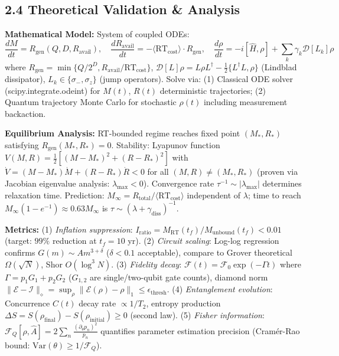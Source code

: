 \documentclass[a4paper,11pt,twoside]{article}
\begin{document}
\vspace{-4pt}
\subsection*{2.4 Theoretical Validation \& Analysis}
\vspace{-4pt}

\textbf{Mathematical Model:} System of coupled ODEs:
\vspace{-4pt}
\[
\frac{dM}{dt} = R_{\text{gen}}(Q, D, R_{\text{avail}}), \quad \frac{dR_{\text{avail}}}{dt} = -\langle\text{RT}_{\text{cost}}\rangle \cdot R_{\text{gen}}, \quad \frac{d\rho}{dt} = -i[\hat{H}, \rho] + \sum_k \gamma_k \mathcal{D}[L_k]\rho
\]
\vspace{-6pt}
where $R_{\text{gen}} = \min\{Q/2^D, R_{\text{avail}}/\text{RT}_{\text{cost}}\}$, $\mathcal{D}[L]\rho = L\rho L^\dagger - \frac{1}{2}\{L^\dagger L, \rho\}$ (Lindblad dissipator), $L_k \in \{\sigma_-, \sigma_z\}$ (jump operators). Solve via: (1) Classical ODE solver (scipy.integrate.odeint) for $M(t)$, $R(t)$ deterministic trajectories; (2) Quantum trajectory Monte Carlo for stochastic $\rho(t)$ including measurement backaction.

\textbf{Equilibrium Analysis:} RT-bounded regime reaches fixed point $(M_*, R_*)$ satisfying $R_{\text{gen}}(M_*, R_*) = 0$. Stability: Lyapunov function $V(M,R) = \frac{1}{2}[(M-M_*)^2 + (R-R_*)^2]$ with $\dot{V} = (M-M_*)\dot{M} + (R-R_*)\dot{R} < 0$ for all $(M,R) \neq (M_*,R_*)$ (proven via Jacobian eigenvalue analysis: $\lambda_{\text{max}} < 0$). Convergence rate $\tau^{-1} \sim |\lambda_{\text{max}}|$ determines relaxation time. Prediction: $M_{\infty} = R_{\text{total}}/\langle\text{RT}_{\text{cost}}\rangle$ independent of $\lambda$; time to reach $M_{\infty}(1-e^{-1}) \approx 0.63M_{\infty}$ is $\tau \sim (\lambda + \gamma_{\text{diss}})^{-1}$.

\textbf{Metrics:} (1) \textit{Inflation suppression}: $I_{\text{ratio}} = M_{\text{RT}}(t_f)/M_{\text{unbound}}(t_f) < 0.01$ (target: $99\%$ reduction at $t_f = 10$ yr). (2) \textit{Circuit scaling}: Log-log regression confirms $G(m) \sim Am^{3+\delta}$ ($\delta < 0.1$ acceptable), compare to Grover theoretical $\Omega(\sqrt{N})$, Shor $O(\log^3 N)$. (3) \textit{Fidelity decay}: $\mathcal{F}(t) = \mathcal{F}_0 \exp(-\Gamma t)$ where $\Gamma = p_1 G_1 + p_2 G_2$ ($G_{1,2}$ are single/two-qubit gate counts), diamond norm $\|\mathcal{E} - \mathcal{I}\|_\diamond = \sup_{\rho}\|\mathcal{E}(\rho) - \rho\|_1 \leq \epsilon_{\text{thresh}}$. (4) \textit{Entanglement evolution}: Concurrence $C(t)$ decay rate $\propto 1/T_2$, entropy production $\Delta S = S(\rho_{\text{final}}) - S(\rho_{\text{initial}}) \geq 0$ (second law). (5) \textit{Fisher information}: $\mathcal{F}_Q[\rho,\hat{A}] = 2\sum_n \frac{(\partial_\theta p_n)^2}{p_n}$ quantifies parameter estimation precision (Cramér-Rao bound: $\text{Var}(\theta) \geq 1/\mathcal{F}_Q$).
\end{document}
